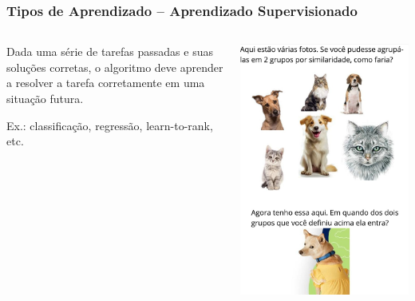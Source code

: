 \begin{frame}
    \frametitle{Tipos de Aprendizado – Aprendizado Supervisionado}
    \begin{columns} 
        \begin{flushleft}
            Dada uma série de tarefas passadas e suas soluções corretas, o algoritmo deve aprender a resolver a tarefa corretamente em uma situação futura.

            Ex.: classificação, regressão, learn-to-rank, etc.                    
        \end{flushleft}
        \begin{center}
            \includegraphics[height=0.6\paperheight]{./imgs/fig7-unsupervised.jpg}
        \end{center}
    \end{columns}
\end{frame}

